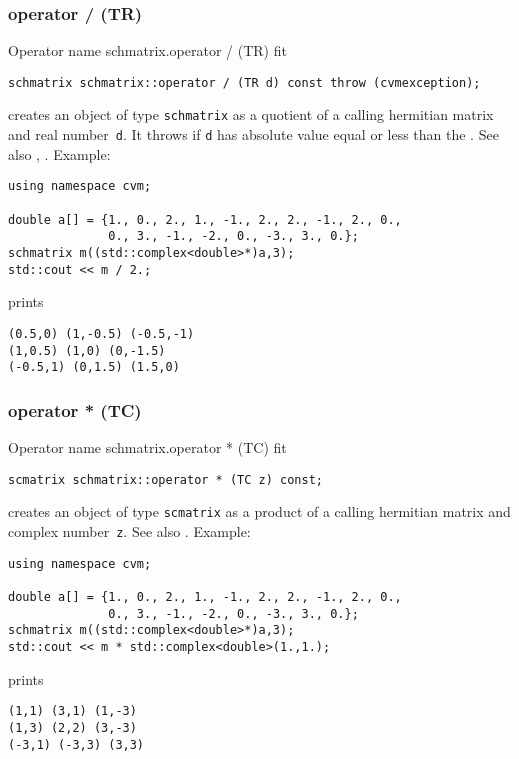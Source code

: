 \subsubsection{operator / (TR)}
Operator%
\pdfdest name {schmatrix.operator / (TR)} fit
\begin{verbatim}
schmatrix schmatrix::operator / (TR d) const throw (cvmexception);
\end{verbatim}
creates an object of type \verb"schmatrix" as a quotient of
a calling hermitian matrix and  real number~\verb"d". It throws
if \verb"d" has  absolute value equal or less than the
.
See also ,
.
Example:
\begin{Verbatim}
using namespace cvm;

double a[] = {1., 0., 2., 1., -1., 2., 2., -1., 2., 0.,
              0., 3., -1., -2., 0., -3., 3., 0.};
schmatrix m((std::complex<double>*)a,3);
std::cout << m / 2.;
\end{Verbatim}
prints
\begin{Verbatim}
(0.5,0) (1,-0.5) (-0.5,-1)
(1,0.5) (1,0) (0,-1.5)
(-0.5,1) (0,1.5) (1.5,0)
\end{Verbatim}
\newpage



\subsubsection{operator * (TC)}
Operator%
\pdfdest name {schmatrix.operator * (TC)} fit
\begin{verbatim}
scmatrix schmatrix::operator * (TC z) const;
\end{verbatim}
creates an object of type \verb"scmatrix" as a product of
a calling hermitian matrix and  complex number~\verb"z".
See also .
Example:
\begin{Verbatim}
using namespace cvm;

double a[] = {1., 0., 2., 1., -1., 2., 2., -1., 2., 0.,
              0., 3., -1., -2., 0., -3., 3., 0.};
schmatrix m((std::complex<double>*)a,3);
std::cout << m * std::complex<double>(1.,1.);
\end{Verbatim}
prints
\begin{Verbatim}
(1,1) (3,1) (1,-3)
(1,3) (2,2) (3,-3)
(-3,1) (-3,3) (3,3)
\end{Verbatim}
\newpage



